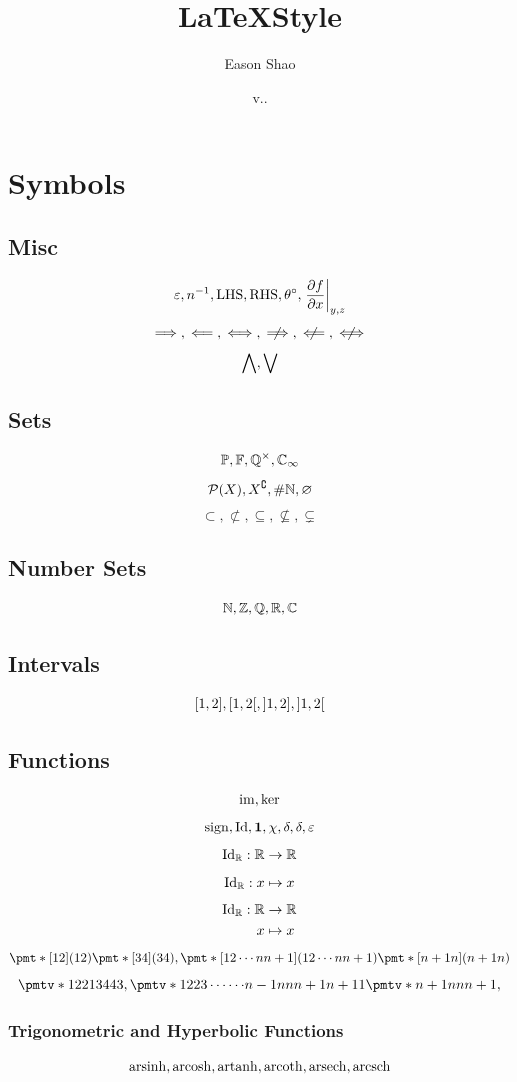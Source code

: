 \documentclass{article}
\title{\LaTeX Style}
\author{Eason Shao}
\date{v.\DATE.\COMMITSHA}
\begin{document}
\maketitle

\section{Symbols}
\subsection{Misc}
\[
    \varepsilon, n^{-1}, \text{LHS}, \text{RHS}, \theta^{\circ}, \left.\pdv{f}{x}\right\rvert_{y, z}
\]
\[
    \implies, \impliedby, \iff, \notimplies, \notimpliedby, \notiff
\]
\[
    \bigwedge, \bigvee
\]

\subsection{Sets}
\[
    \mathbb{P}, \mathbb{F}, \mathbb{Q}^{\times}, \mathbb{C}_{\infty}
\]
\[
    \powerset\pqty{X}, X\compl, \size\NN, \emptyset
\]
\[
    \subset, \nsubset, \subseteq, \nsubseteq, \subsetneq
\]

\subsection{Number Sets}
\[
    \mathbb{N}, \mathbb{Z}, \mathbb{Q}, \mathbb{R}, \mathbb{C}
\]

\subsection{Intervals}
\[
    \ccintv{1}{2}, \cointv{1}{2}, \ocintv{1}{2}, \oointv{1}{2}
\]

\subsection{Functions}
\[
    \operatorname{im}, \ker
\]
\[
    \operatorname{sign}, \operatorname{Id}, \mathbf{1}, \chi, \delta, \delta, \varepsilon
\]
\[
    \operatorname{Id}_{\mathbb{R}}: \mathbb{R} \to \mathbb{R}
\]
\[
    \operatorname{Id}_{\mathbb{R}}: x \mapsto x
\]
\[
    \begin{aligned} \operatorname{Id}_{\mathbb{R}}: \mathbb{R} &\to \mathbb{R} \\ x &\mapsto x \end{aligned}
\]
\[
    \perm{12} \perm{34}, \perm{{1}{2}\cdots{n}{n + 1}} \perm{{n + 1}n}
\]
\[
    \permverb{1234}{1{2} 2{1} 3{4} 4{3}}, \permverb{12{\cdots}{n - 1}{n}{n + 1}}{1{2} 2{3} \cdots{\cdots} {n - 1}{n} {n}{n + 1} {n + 1}{1}} \permverb{{n}{n + 1}}{{n + 1}{n} {n}{n + 1}},
\]

\subsubsection{Trigonometric and Hyperbolic Functions}
\[
    \operatorname{arsinh}, \operatorname{arcosh}, \operatorname{artanh}, \operatorname{arcoth}, \operatorname{arsech}, \operatorname{arcsch}
\]
\end{document}
